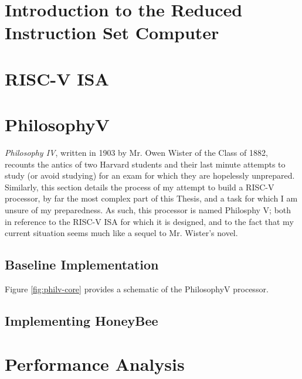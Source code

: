 
\section{Introduction to the Reduced Instruction Set Computer}
    

\section{RISC-V ISA}
    

\section{PhilosophyV}
    \textit{Philosophy IV}, written in 1903 by Mr. Owen Wister of the Class of 1882, recounts the antics of two Harvard students and their last minute attempts to study (or avoid studying) for an exam for which they are hopelessly unprepared. Similarly, this section details the process of my attempt to build a RISC-V processor, by far the most complex part of this Thesis, and a task for which I am unsure of my preparedness. As such, this processor is named Philosphy V; both in reference to the RISC-V ISA for which it is designed, and to the fact that my current situation seems much like a sequel to Mr. Wister's novel.

    \subsection{Baseline Implementation}
        Figure \ref{fig:philv-core} provides a schematic of the PhilosophyV processor.
         

    \subsection{Implementing HoneyBee}

\section{Performance Analysis}
